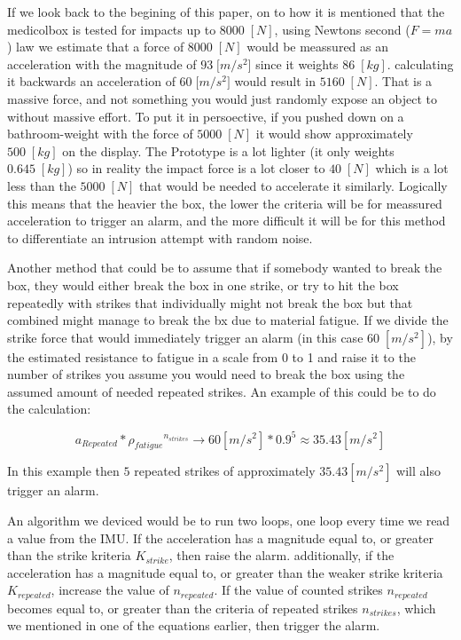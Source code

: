\documentclass[../main.tex]{subfiles}
\begin{document}
If we look back to the begining of this paper, on to how it is mentioned that
the \gls{medicolbox} is tested for impacts up to $8 000\;[N]$, using Newtons second ($F=ma$) law we estimate that a force of $8 000\;[N]$ would be meassured as an acceleration with the magnitude of $93\;[{m/s^2]}$ since it weights $86\;[kg]$. calculating it backwards an acceleration of $60\;[{m/s^2]}$ would result in $5160\;[N]$. That is a massive force, and not something you would just randomly expose an object to without massive effort. To put it in persoective, if you pushed down on a bathroom-weight with the force of $5000\;[N]$ it would show approximately $500\;[kg]$ on the display.
The Prototype is a lot lighter (it only weights $0.645\;[kg]$)
so in reality the impact force is a lot closer to $40\;[N]$ which is a lot less than the $5000\;[N]$ that would be needed to accelerate it similarly. Logically this means that the heavier the box, the lower the criteria will be for meassured acceleration to trigger an alarm, and the more difficult it will be for this method to differentiate an intrusion attempt with random noise.

Another method that could be to assume that if somebody wanted to break the box, they would either break the box in one strike, or try to hit the box repeatedly with strikes that individually might not break the box but that combined might manage to break the bx due to material fatigue. If we divide the strike force that would immediately trigger an alarm (in this case $60\;[m/s^2]$), by the estimated resistance to fatigue in a scale from 0 to 1 and raise it to the number of strikes you assume you would need to break the box using the assumed amount of needed repeated strikes. An example of this could be to do the calculation:

$$a_{Repeated} * {\rho_{fatigue}}^{n_{strikes}} \rightarrow 60 [m/s^2] * 0.9^5 \approx 35.43 [m/s^2] $$

In this example then $5$ repeated strikes of approximately $35.43 [m/s^2]$ will also trigger an alarm.

An algorithm we deviced would be to run two loops, one loop every time we read a value from the IMU.
If the acceleration has a magnitude equal to, or greater than the
strike kriteria $K_{strike}$, then raise the alarm.
additionally, if the acceleration has a magnitude equal to,
or greater than the weaker strike kriteria $K_{repeated}$, increase the value of $n_{repeated}$.
If the value of counted strikes $n_{repeated}$ becomes equal to,
or greater than the criteria of repeated strikes $n_{strikes}$,
which we mentioned in one of the equations earlier, then trigger the alarm.
\end{document}
